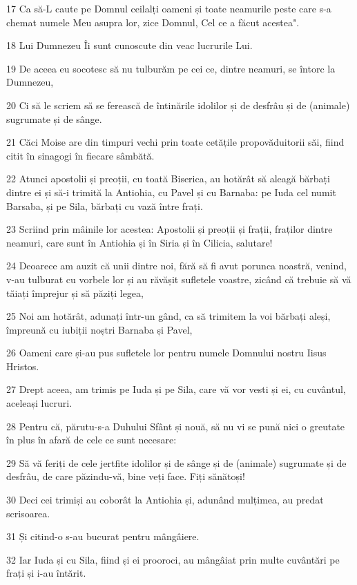 \par 17 Ca să-L caute pe Domnul ceilalți oameni și toate neamurile peste care s-a chemat numele Meu asupra lor, zice Domnul, Cel ce a făcut acestea".
\par 18 Lui Dumnezeu Îi sunt cunoscute din veac lucrurile Lui.
\par 19 De aceea eu socotesc să nu tulburăm pe cei ce, dintre neamuri, se întorc la Dumnezeu,
\par 20 Ci să le scriem să se ferească de întinările idolilor și de desfrâu și de (animale) sugrumate și de sânge.
\par 21 Căci Moise are din timpuri vechi prin toate cetățile propovăduitorii săi, fiind citit în sinagogi în fiecare sâmbătă.
\par 22 Atunci apostolii și preoții, cu toată Biserica, au hotărât să aleagă bărbați dintre ei și să-i trimită la Antiohia, cu Pavel și cu Barnaba: pe Iuda cel numit Barsaba, și pe Sila, bărbați cu vază între frați.
\par 23 Scriind prin mâinile lor acestea: Apostolii și preoții și frații, fraților dintre neamuri, care sunt în Antiohia și în Siria și în Cilicia, salutare!
\par 24 Deoarece am auzit că unii dintre noi, fără să fi avut porunca noastră, venind, v-au tulburat cu vorbele lor și au răvășit sufletele voastre, zicând că trebuie să vă tăiați împrejur și să păziți legea,
\par 25 Noi am hotărât, adunați într-un gând, ca să trimitem la voi bărbați aleși, împreună cu iubiții noștri Barnaba și Pavel,
\par 26 Oameni care și-au pus sufletele lor pentru numele Domnului nostru Iisus Hristos.
\par 27 Drept aceea, am trimis pe Iuda și pe Sila, care vă vor vesti și ei, cu cuvântul, aceleași lucruri.
\par 28 Pentru că, părutu-s-a Duhului Sfânt și nouă, să nu vi se pună nici o greutate în plus în afară de cele ce sunt necesare:
\par 29 Să vă feriți de cele jertfite idolilor și de sânge și de (animale) sugrumate și de desfrâu, de care păzindu-vă, bine veți face. Fiți sănătoși!
\par 30 Deci cei trimiși au coborât la Antiohia și, adunând mulțimea, au predat scrisoarea.
\par 31 Și citind-o s-au bucurat pentru mângâiere.
\par 32 Iar Iuda și cu Sila, fiind și ei prooroci, au mângâiat prin multe cuvântări pe frați și i-au întărit.
